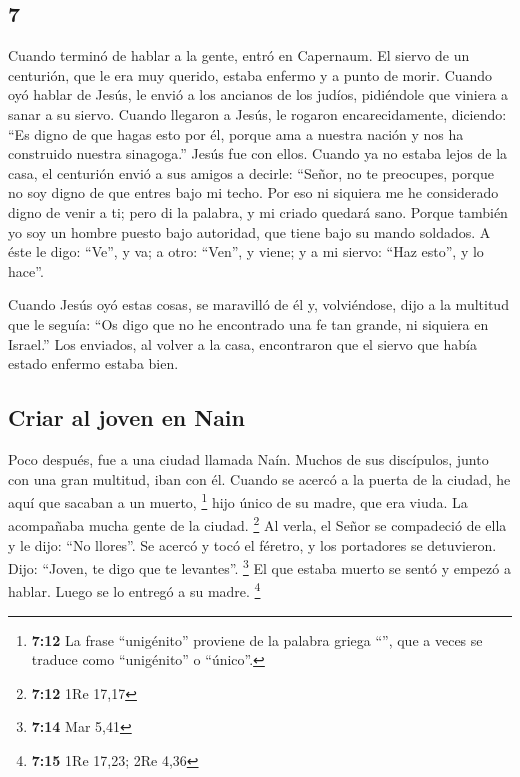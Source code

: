 \begin{paracol}{2}
\hypertarget{section-12}{%
\section{7}\label{section-12}}

 Cuando terminó de hablar a la gente, entró en Capernaum.
 El siervo de un centurión, que le era muy querido, estaba
enfermo y a punto de morir.  Cuando oyó hablar de Jesús,
le envió a los ancianos de los judíos, pidiéndole que viniera a sanar a
su siervo.  Cuando llegaron a Jesús, le rogaron
encarecidamente, diciendo: ``Es digno de que hagas esto por él,
 porque ama a nuestra nación y nos ha construido nuestra
sinagoga.''  Jesús fue con ellos. Cuando ya no estaba
lejos de la casa, el centurión envió a sus amigos a decirle: ``Señor, no
te preocupes, porque no soy digno de que entres bajo mi techo.
 Por eso ni siquiera me he considerado digno de venir a
ti; pero di la palabra, y mi criado quedará sano.  Porque
también yo soy un hombre puesto bajo autoridad, que tiene bajo su mando
soldados. A éste le digo: ``Ve'', y va; a otro: ``Ven'', y viene; y a mi
siervo: ``Haz esto'', y lo hace''.

 Cuando Jesús oyó estas cosas, se maravilló de él y,
volviéndose, dijo a la multitud que le seguía: ``Os digo que no he
encontrado una fe tan grande, ni siquiera en Israel.'' 
Los enviados, al volver a la casa, encontraron que el siervo que había
estado enfermo estaba bien.

\hypertarget{criar-al-joven-en-nain}{%
\subsection{Criar al joven en Nain}\label{criar-al-joven-en-nain}}

 Poco después, fue a una ciudad llamada Naín. Muchos de
sus discípulos, junto con una gran multitud, iban con él.
 Cuando se acercó a la puerta de la ciudad, he aquí que
sacaban a un muerto, \footnote{\textbf{7:12} La frase ``unigénito''
  proviene de la palabra griega ``'', que a veces se
  traduce como ``unigénito'' o ``único''.} hijo único de su madre, que
era viuda. La acompañaba mucha gente de la ciudad. \footnote{\textbf{7:12}
  1Re 17,17}  Al verla, el Señor se compadeció de ella y
le dijo: ``No llores''.  Se acercó y tocó el féretro, y
los portadores se detuvieron. Dijo: ``Joven, te digo que te levantes''.
\footnote{\textbf{7:14} Mar 5,41}  El que estaba muerto
se sentó y empezó a hablar. Luego se lo entregó a su madre. \footnote{\textbf{7:15}
  1Re 17,23; 2Re 4,36}


\end{paracol}

